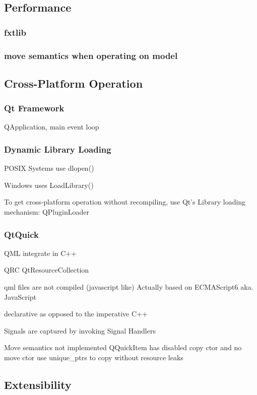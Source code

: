 \subsection{Performance}
\subsubsection{fxtlib}
\subsubsection{move semantics when operating on model}

\subsection{Cross-Platform Operation}
\subsubsection{Qt Framework}
QApplication, main event loop

\subsubsection{Dynamic Library Loading}
POSIX Systems use dlopen()

Windows uses LoadLibrary()

To get cross-platform operation without recompiling, use Qt's Library loading mechanism: QPluginLoader

\subsubsection{QtQuick}
QML integrate in C++

QRC QtResourceCollection

qml files are not compiled (javascript like)
Actually based on ECMAScript6 aka. JavaScript

declarative as opposed to the imperative  C++

Signals are captured by invoking Signal Handlers

Move semantics not implemented
QQuickItem has disabled copy ctor and no move ctor
use unique_ptrs to copy without resource leaks


\subsection{Extensibility}
